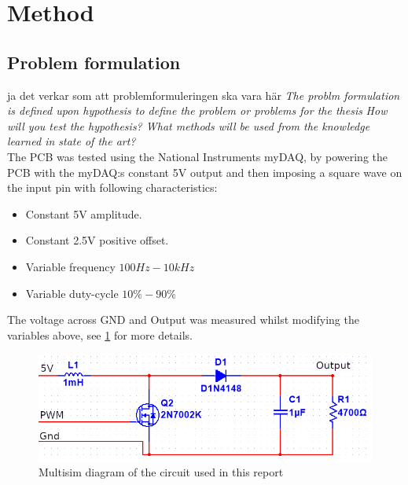 \section{Method}
\subsection{Problem formulation}
ja det verkar som att problemformuleringen ska vara här
\textit{The problm formulation is defined upon hypothesis to define the problem or problems for the thesis}
\textit{How will you test the hypothesis? What methods will be used from the knowledge learned in state of the art?}
\\The PCB was tested using the National Instruments myDAQ, by powering the PCB with the myDAQ:s constant 5V output and then imposing a square wave on the input pin with following characteristics:
\begin{itemize}
        \item Constant 5V amplitude.
        \item Constant 2.5V positive offset.
        \item Variable frequency $100Hz-10kHz$
        \item Variable duty-cycle $10\% - 90\%$
\end{itemize}
The voltage across GND and Output was measured whilst modifying the variables above, see \ref{fig:pcb} for more details.
\begin{figure}
    \includegraphics[width=\linewidth]{CircuitDesign.jpg}
    \caption{Multisim diagram of the circuit used in this report}
    \label{fig:pcb}
\end{figure}

